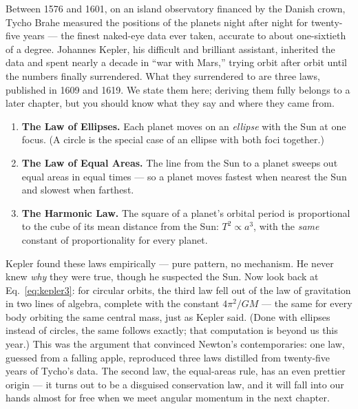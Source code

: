 Between 1576 and 1601, on an island observatory financed by the Danish crown,
Tycho Brahe measured the positions of the planets night after night for
twenty-five years --- the finest naked-eye data ever taken, accurate to about
one-sixtieth of a degree. Johannes Kepler, his difficult and brilliant
assistant, inherited the data and spent nearly a decade in ``war with Mars,''
trying orbit after orbit until the numbers finally surrendered. What they
surrendered to are three laws, published in 1609 and 1619. We state them here;
deriving them fully belongs to a later chapter, but you should know what they
say and where they came from.

\begin{keybox}
\begin{enumerate}[leftmargin=2em, itemsep=2pt]
  \item \textbf{The Law of Ellipses.} Each planet moves on an \emph{ellipse}
        with the Sun at one focus. (A circle is the special case of an
        ellipse with both foci together.)
  \item \textbf{The Law of Equal Areas.} The line from the Sun to a planet
        sweeps out equal areas in equal times --- so a planet moves fastest
        when nearest the Sun and slowest when farthest.
  \item \textbf{The Harmonic Law.} The square of a planet's orbital period is
        proportional to the cube of its mean distance from the Sun:
        $T^2 \propto a^3$, with the \emph{same} constant of proportionality
        for every planet.
\end{enumerate}
\end{keybox}

Kepler found these laws empirically --- pure pattern, no mechanism. He never
knew \emph{why} they were true, though he suspected the Sun. Now look back at
Eq.~\eqref{eq:kepler3}: for circular orbits, the third law fell out of the
law of gravitation in two lines of algebra, complete with the constant
$4\pi^2/GM$ --- the same for every body orbiting the same central mass, just
as Kepler said. (Done with ellipses instead of circles, the same follows
exactly; that computation is beyond us this year.) This was the argument that
convinced Newton's contemporaries: one law, guessed from a falling apple,
reproduced three laws distilled from twenty-five years of Tycho's data. The
second law, the equal-areas rule, has an even prettier origin --- it turns out
to be a disguised conservation law, and it will fall into our hands almost
for free when we meet angular momentum in the next chapter.

